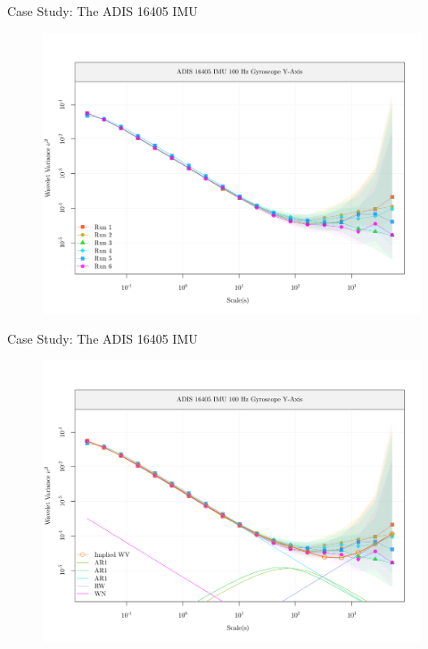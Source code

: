 \documentclass[envcountsect,usenames,dvipsnames]{beamer}
\theoremstyle{mystyle}
\begin{document}
\begin{frame}{Case Study: The ADIS 16405 IMU}
    \begin{figure}
        \centering
        \includegraphics[scale = 0.5]{Images/adis1.pdf}
    \end{figure}
\end{frame}

\begin{frame}{Case Study: The ADIS 16405 IMU}
    \begin{figure}
        \centering
        \includegraphics[scale = 0.5]{Images/adis2.pdf}
    \end{figure}
\end{frame}
\end{document}
